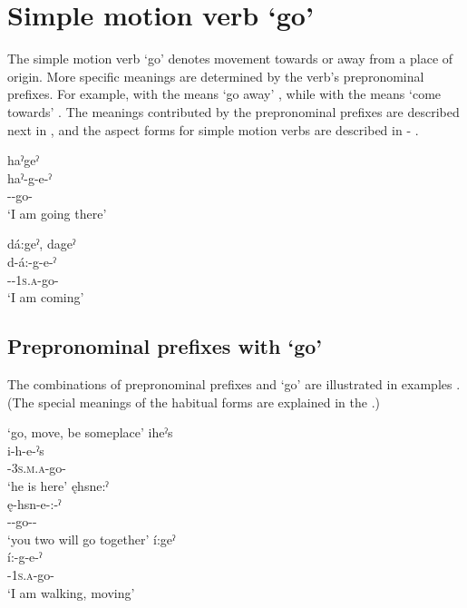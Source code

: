 \section{Simple motion verb  ‘go’} \label{ch:Simple motion verb [e] ‘go’}
The simple motion verb  ‘go’ denotes movement towards or away from a place of origin. More specific meanings are determined by the verb’s prepronominal prefixes. For example,  with the  \textsc{\translocative} means ‘go away’ , while  with the  \textsc{\cislocative} means ‘come towards’ . The meanings contributed by the prepronominal prefixes are described next in , and the aspect forms for simple motion verbs are described in  - .

\ea\label{ex:simplemotex} 
\ea haˀgeˀ\\\label{ex:simplemotexa}
\gll haˀ-g-e-ˀ\\
 {\translocative}--go-{\aspect}\\
\glt `I am going there'


\ex dá:geˀ, dageˀ \\\label{ex:simplemotexb}
\gll d-á:-g-e-ˀ\\
 {\cislocative}-{\factual}-\textsc{1s.a}-go-{\aspect}\\
\glt `I am coming'
\z
\z



\subsection{Prepronominal prefixes with  ‘go’} \label{ch:Prepronominal prefixes with [e] ‘go’}
The combinations of prepronominal prefixes and  ‘go’ are illustrated in examples . (The special meanings of the habitual forms are explained in the .)

\ea\label{ex:ppe1}  ‘go, move, be someplace’
\ea iheˀs\\
\gll i-h-e-ˀs\\
 {\prothetic}-\textsc{3s.m.a}-go-{\habitual}\\
\glt `he is here'
\ex ęhsne:ˀ\\
\gll ę-hsn-e-:-ˀ\\
 \fut--go-{\purposive}-{\punctual}\\
\glt `you two will go together'
\ex í:geˀ\\
\gll í:-g-e-ˀ\\
 {\prothetic}-\textsc{1s.a}-go-{\stative}\\
\glt `I am walking, moving'
\z
\z

